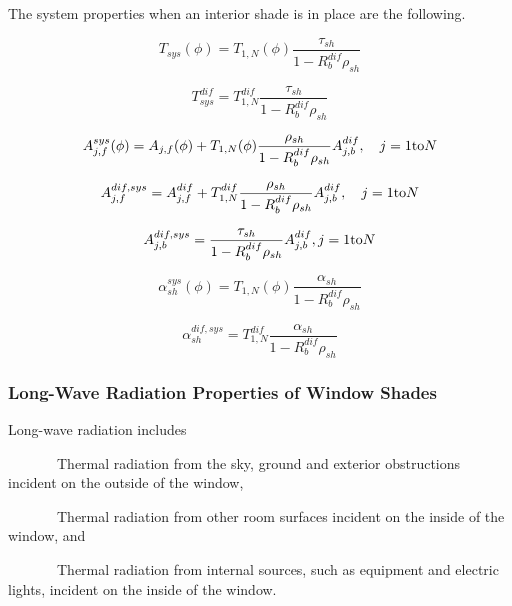 The system properties when an interior shade is in place are the following.

\begin{equation}
{T_{sys}}(\phi ) = T_{1,N}^{}(\phi )\frac{{{\tau_{sh}}}}{{1 - R_b^{dif}{\rho_{sh}}}}
\end{equation}

\begin{equation}
T_{sys}^{dif} = T_{1,N}^{dif}\frac{{{\tau_{sh}}}}{{1 - R_b^{dif}{\rho_{sh}}}}
\end{equation}

\begin{equation}
A_{j,f}^{sys}(\phi ) = {A_{j,f}}(\phi ) + {T_{1,N}}(\phi )\frac{{{\rho_{sh}}}}{{1 - R_b^{dif}{\rho_{sh}}}}A_{j,b}^{dif},\quad j = 1{\rm{ to }}N
\end{equation}

\begin{equation}
A_{j,f}^{dif,sys} = A_{j,f}^{dif} + T_{1,N}^{dif}\frac{{{\rho_{sh}}}}{{1 - R_b^{dif}{\rho_{sh}}}}A_{j,b}^{dif},\quad j = 1{\rm{ to }}N
\end{equation}

\begin{equation}
A_{j,b}^{dif,sys} = \frac{{{\tau_{sh}}}}{{1 - R_b^{dif}{\rho_{sh}}}}A_{j,b}^{dif},{\rm{    }}j = 1{\rm{ to }}N
\end{equation}

\begin{equation}
\alpha_{sh}^{sys}(\phi ) = T_{1,N}^{}(\phi )\frac{{{\alpha_{sh}}}}{{1 - R_b^{dif}{\rho_{sh}}}}
\end{equation}

\begin{equation}
\alpha_{sh}^{dif,sys} = T_{1,N}^{dif}\frac{{{\alpha_{sh}}}}{{1 - R_b^{dif}{\rho_{sh}}}}
\end{equation}

\subsubsection{Long-Wave Radiation Properties of Window Shades}\label{long-wave-radiation-properties-of-window-shades}

Long-wave radiation includes

~~~~~~~Thermal radiation from the sky, ground and exterior obstructions incident on the outside of the window,

~~~~~~~Thermal radiation from other room surfaces incident on the inside of the window, and

~~~~~~~Thermal radiation from internal sources, such as equipment and electric lights, incident on the inside of the window.

